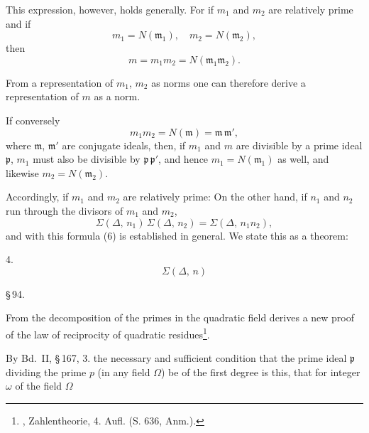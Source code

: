 
This expression, however, holds generally. For if $m_1$ and $m_2$ are
relatively prime and if
\[
m_1 = N(\mathfrak{m}_1), \quad m_2 = N(\mathfrak{m}_2),
\]
then
\[
m = m_1 m_2 = N(\mathfrak{m}_1 \mathfrak{m}_2).
\]

From a representation of $m_1$, $m_2$ as norms one can therefore derive
a representation of $m$ as a norm.

If conversely
\[
m_1 m_2 = N(\mathfrak{m}) = \mathfrak{m}\,\mathfrak{m}',
\]
where $\mathfrak{m}$, $\mathfrak{m}'$ are conjugate ideals, then, if $m_1$ and $m$ are divisible by
a prime ideal $\mathfrak{p}$, $m_1$ must also be divisible by $\mathfrak{p}\,\mathfrak{p}'$, and hence
$m_1 = N(\mathfrak{m}_1)$ as well, and likewise $m_2 = N(\mathfrak{m}_2)$.

Accordingly, if $m_1$ and $m_2$ are relatively prime:
On the other hand, if $n_1$ and $n_2$ run through the divisors of $m_1$ and $m_2$,
\[
\Sigma(\Delta,\, n_1)\, \Sigma(\Delta,\, n_2) = \Sigma(\Delta,\, n_1 n_2),
\]
and with this formula (6) is established in general. We
state this as a theorem:

4. 
\[
\Sigma(\Delta,\, n)
\]

\S\,94. 

From the decomposition of the primes in the quadratic field
 derives a new proof of the law of reciprocity
of quadratic residues\footnote{, Zahlentheorie, 4. Aufl. (S. 636, Anm.).}.

By Bd.\ II, \S\,167, 3. the necessary and sufficient
condition that the prime ideal $\mathfrak{p}$ dividing the prime $p$
(in any field $\Omega$) be of the first degree is this,
that for  integer $\omega$ of the field $\Omega$
